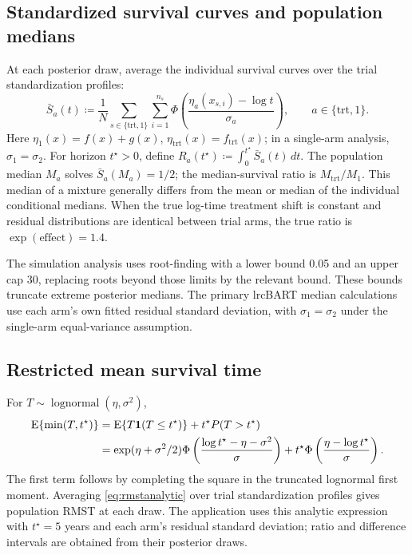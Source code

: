 \subsection{Standardized survival curves and population medians}\label{sec:D.3}
At each posterior draw, average the individual survival curves over the trial standardization profiles:
\begin{equation}
\bar S_a(t)\coloneqq \frac1N\sum_{s\in\{\mathrm{trt},1\}}\sum_{i=1}^{n_s}\Phi\left(\frac{\eta_a(x_{s,i})-\log t}{\sigma_a}\right),\qquad a\in\{\mathrm{trt},1\}.
\end{equation}
Here $\eta_{1}(x)=f(x)+g(x)$, $\eta_{\mathrm{trt}}(x)=f_{\mathrm{trt}}(x)$; in a single-arm analysis, $\sigma_{1}=\sigma_{2}$. For horizon $t^\star>0$, define $R_a(t^\star)\coloneqq\int_0^{t^\star}\bar S_a(t)\,dt$. The population median $M_a$ solves $\bar S_a(M_a)=1/2$; the median-survival ratio is $M_{\mathrm{trt}}/M_{1}$. This median of a mixture generally differs from the mean or median of the individual conditional medians. When the true log-time treatment shift is constant and residual distributions are identical between trial arms, the true ratio is $\exp(\mathrm{effect})=1.4$.

The simulation analysis uses root-finding with a lower bound 0.05 and an upper cap 30, replacing roots beyond those limits by the relevant bound. These bounds truncate extreme posterior medians. The primary lrcBART median calculations use each arm's own fitted residual standard deviation, with $\sigma_{1}=\sigma_{2}$ under the single-arm equal-variance assumption.

\subsection{Restricted mean survival time}\label{sec:D.4}
For $T\sim\operatorname{lognormal}(\eta,\sigma^2)$,
\begin{equation}\label{eq:rmstanalytic}
\begin{aligned}
\operatorname{E}\{\min(T,t^\star)\}
&=\operatorname{E}\{T\mathbf{1}(T\leq t^\star)\}+t^\star P(T>t^\star)\\
&=\exp(\eta+\sigma^2/2)\Phi\left(\frac{\log t^\star-\eta-\sigma^2}{\sigma}\right)
+t^\star\Phi\left(\frac{\eta-\log t^\star}{\sigma}\right).
\end{aligned}
\end{equation}
The first term follows by completing the square in the truncated lognormal first moment. Averaging \eqref{eq:rmstanalytic} over trial standardization profiles gives population RMST at each draw. The application uses this analytic expression with $t^\star=5$ years and each arm's residual standard deviation; ratio and difference intervals are obtained from their posterior draws.

